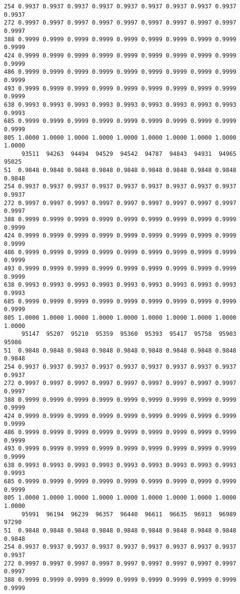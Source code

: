 \documentclass[
]{report}
\begin{document}
\begin{verbatim}
254 0.9937 0.9937 0.9937 0.9937 0.9937 0.9937 0.9937 0.9937 0.9937 0.9937
272 0.9997 0.9997 0.9997 0.9997 0.9997 0.9997 0.9997 0.9997 0.9997 0.9997
388 0.9999 0.9999 0.9999 0.9999 0.9999 0.9999 0.9999 0.9999 0.9999 0.9999
424 0.9999 0.9999 0.9999 0.9999 0.9999 0.9999 0.9999 0.9999 0.9999 0.9999
486 0.9999 0.9999 0.9999 0.9999 0.9999 0.9999 0.9999 0.9999 0.9999 0.9999
493 0.9999 0.9999 0.9999 0.9999 0.9999 0.9999 0.9999 0.9999 0.9999 0.9999
638 0.9993 0.9993 0.9993 0.9993 0.9993 0.9993 0.9993 0.9993 0.9993 0.9993
685 0.9999 0.9999 0.9999 0.9999 0.9999 0.9999 0.9999 0.9999 0.9999 0.9999
805 1.0000 1.0000 1.0000 1.0000 1.0000 1.0000 1.0000 1.0000 1.0000 1.0000
     93511  94263  94494  94529  94542  94787  94843  94931  94965  95025
51  0.9848 0.9848 0.9848 0.9848 0.9848 0.9848 0.9848 0.9848 0.9848 0.9848
254 0.9937 0.9937 0.9937 0.9937 0.9937 0.9937 0.9937 0.9937 0.9937 0.9937
272 0.9997 0.9997 0.9997 0.9997 0.9997 0.9997 0.9997 0.9997 0.9997 0.9997
388 0.9999 0.9999 0.9999 0.9999 0.9999 0.9999 0.9999 0.9999 0.9999 0.9999
424 0.9999 0.9999 0.9999 0.9999 0.9999 0.9999 0.9999 0.9999 0.9999 0.9999
486 0.9999 0.9999 0.9999 0.9999 0.9999 0.9999 0.9999 0.9999 0.9999 0.9999
493 0.9999 0.9999 0.9999 0.9999 0.9999 0.9999 0.9999 0.9999 0.9999 0.9999
638 0.9993 0.9993 0.9993 0.9993 0.9993 0.9993 0.9993 0.9993 0.9993 0.9993
685 0.9999 0.9999 0.9999 0.9999 0.9999 0.9999 0.9999 0.9999 0.9999 0.9999
805 1.0000 1.0000 1.0000 1.0000 1.0000 1.0000 1.0000 1.0000 1.0000 1.0000
     95147  95207  95210  95359  95360  95393  95417  95758  95903  95986
51  0.9848 0.9848 0.9848 0.9848 0.9848 0.9848 0.9848 0.9848 0.9848 0.9848
254 0.9937 0.9937 0.9937 0.9937 0.9937 0.9937 0.9937 0.9937 0.9937 0.9937
272 0.9997 0.9997 0.9997 0.9997 0.9997 0.9997 0.9997 0.9997 0.9997 0.9997
388 0.9999 0.9999 0.9999 0.9999 0.9999 0.9999 0.9999 0.9999 0.9999 0.9999
424 0.9999 0.9999 0.9999 0.9999 0.9999 0.9999 0.9999 0.9999 0.9999 0.9999
486 0.9999 0.9999 0.9999 0.9999 0.9999 0.9999 0.9999 0.9999 0.9999 0.9999
493 0.9999 0.9999 0.9999 0.9999 0.9999 0.9999 0.9999 0.9999 0.9999 0.9999
638 0.9993 0.9993 0.9993 0.9993 0.9993 0.9993 0.9993 0.9993 0.9993 0.9993
685 0.9999 0.9999 0.9999 0.9999 0.9999 0.9999 0.9999 0.9999 0.9999 0.9999
805 1.0000 1.0000 1.0000 1.0000 1.0000 1.0000 1.0000 1.0000 1.0000 1.0000
     95991  96194  96239  96357  96440  96611  96635  96913  96989  97290
51  0.9848 0.9848 0.9848 0.9848 0.9848 0.9848 0.9848 0.9848 0.9848 0.9848
254 0.9937 0.9937 0.9937 0.9937 0.9937 0.9937 0.9937 0.9937 0.9937 0.9937
272 0.9997 0.9997 0.9997 0.9997 0.9997 0.9997 0.9997 0.9997 0.9997 0.9997
388 0.9999 0.9999 0.9999 0.9999 0.9999 0.9999 0.9999 0.9999 0.9999 0.9999

\end{verbatim}
\end{document}
